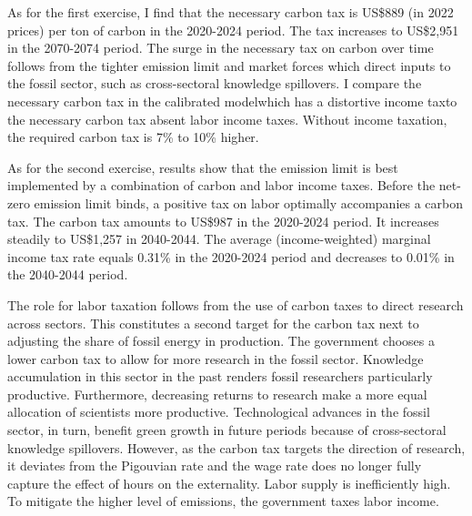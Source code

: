 As for the first exercise, I find that the necessary carbon tax is US\$889 (in 2022 prices) per ton of carbon in the 2020-2024 period. The tax increases to US\$2,951 in the 2070-2074 period. %
The surge in the necessary tax on carbon over time follows from the tighter emission limit and market forces which direct inputs to the fossil sector, such as cross-sectoral knowledge spillovers. I compare the necessary carbon tax in the calibrated model\textemdash which has a distortive income tax\textemdash to the necessary carbon tax absent labor income taxes. Without income taxation, the required carbon tax is  7\% to 10\% higher.

As for the second exercise, results show that the emission limit is best implemented by a combination of carbon and labor income taxes. Before the net-zero emission limit binds, a positive tax on labor optimally accompanies a carbon tax. The carbon tax amounts to US\$987 in the 2020-2024 period. It increases steadily to US\$1,257 in 2040-2044. The average (income-weighted) marginal income tax rate equals 0.31\% in the 2020-2024 period and decreases to 0.01\% in the 2040-2044 period.

The role for labor taxation follows from the use of carbon taxes to direct research across sectors. This constitutes a second target for the carbon tax next to adjusting the share of fossil energy in production. The government chooses a lower carbon tax to allow for more research in the fossil sector. Knowledge accumulation in this sector in the past renders fossil researchers particularly productive. Furthermore, decreasing returns to research make a more equal allocation of scientists more productive. Technological advances in the fossil sector, in turn, benefit green growth in future periods because of cross-sectoral knowledge spillovers. However, as the carbon tax targets the direction of research, it deviates from the Pigouvian rate and the wage rate does no longer fully capture the effect of hours on the externality. Labor supply is inefficiently high.
To mitigate the higher level of emissions, the government taxes labor income. 

